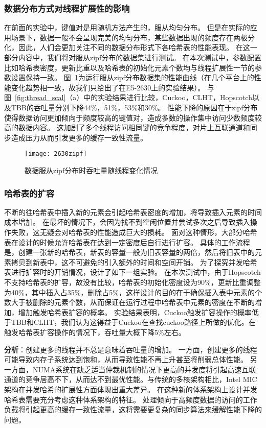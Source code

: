 \subsubsection{数据分布方式对线程扩展性的影响}
在前面的实验中，键值对是用随机方法产生的，服从均匀分布。
但是在实际的应用场景下，数据一般不会呈现完美的均匀分布，某些数据出现的频度存在两极分化，因此，人们会更加关注不同的数据分布形式下各哈希表的性能表现。
在这一部分内容中，我们将对服从zipf分布的数据集进行测试。
在本次测试中，参数配置比如哈希表密度，更新比重以及哈希表的初始化元素个数均与线程扩展性一节的参数设置保持一致。
图~\ref{fig:zipf}为运行服从zipf分布数据集的性能曲线（在几个平台上的性能变化趋势相一致，故我们只给出了在E5-2630上的实验结果）。
与图~\ref{fig:thread_scal}（a）中的实验结果进行比较，Cuckoo，CLHT，Hopscotch以及TBB的吞吐量分别下降44\%，51\%，53\%和30\%。
性能下降的原因在于zipf分布使得数据访问更加倾向于频度较高的键值对，造成多数的操作集中访问少数频度较高的数据内容。
这加剧了多个线程访问相同键的竞争程度，对片上互联通道和同步造成压力从而引发更多的缓存一致性流量。

\begin{figure}[htbp]
\centering
\texttt{[image: 2630zipf]}
\caption{数据服从zipf分布时吞吐量随线程变化情况}
\label{fig:zipf}
\end{figure}

\subsubsection{哈希表的扩容}
不断的往哈希表中插入新的元素会引起哈希表密度的增加，将导致插入元素的时间成本增加。
在最坏的情况下，会因为找不到空闲位置并尝试多次之后导致插入操作失败，这无疑会对哈希表的性能造成巨大的损耗。
面对这种情形，大部分哈希表在设计的时候允许哈希表在达到一定密度后自行进行扩容。
具体的工作流程是，创建一张新的哈希表，新表的容量一般为旧表容量的两倍，然后将旧表中的元素拷贝到新表中，这不可避免的引入额外的时间和空间开销。
为了探究并发哈希表进行扩容时的开销情况，设计了如下一组实验。
在本次测试中，由于Hopscotch不支持哈希表的扩容，故没有比较，哈希表的初始化密度设为90\%，更新比重调整为40\%，其中插入占35\%，删除占5\%，这样设计的目的在于确保插入表中元素的个数大于被删除的元素个数，从而保证在运行过程中哈希表中元素的密度在不断的增加，增加触发哈希表扩容的概率。
实验结果表明，Cuckoo触发扩容操作的概率低于TBB和CLHT，我们认为这得益于Cuckoo在查找cuckoo路径上所做的优化。在触发哈希表扩容操作的情况下，吞吐量大概下降5\%左右。

\textbf{分析}：创建更多的线程并不总是意味着吞吐量的增加。
一方面，创建更多的线程可能导致内存子系统达到饱和，从而导致性能不再上升甚至将削弱总体性能。
另一方面，NUMA系统在缺乏适当仲裁机制的情况下更高的并发度将引起高速互联通道的竞争居高不下，从而达不到最优性能。与传统的多核架构相比，Intel MIC架构在并发哈希的扩展性方面体现出重大差异。
在这种新的体系架构上设计并发哈希表需要充分考虑这种体系架构的特征。
处理倾向于高频度数据的访问的工作负载将引起更高的缓存一致性流量，这将需要更复杂的同步算法来缓解性能下降的问题。

